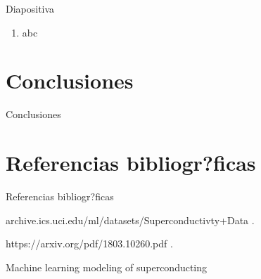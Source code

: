 \documentclass[11pt]{beamer}\usepackage[]{graphicx}\usepackage[]{color}
\begin{document}
\begin{frame}{Diapositiva}
	\begin{enumerate}
		\item abc
	\end{enumerate}
\end{frame}


\section{Conclusiones}

\begin{frame}{Conclusiones}

\end{frame}


\section{Referencias bibliogr?ficas}

\begin{frame}{Referencias bibliogr?ficas}
	\begin{thebibliography}{10}

		\beamertemplateonlinebibitems %
		archive.ics.uci.edu/ml/datasets/Superconductivty+Data
		.

		\beamertemplateonlinebibitems %
		https://arxiv.org/pdf/1803.10260.pdf
		.

		\beamertemplatearticlebibitems %
		Machine learning modeling of superconducting


	\end{thebibliography}
\end{frame}
\end{document}
